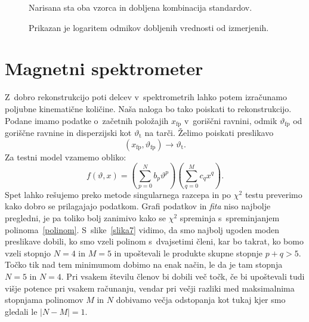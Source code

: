 \documentclass[a4paper,pdftex,12pt]{article}
\numberwithin{figure}{section} %
\begin{document}
\begin{figure}    
    \resizebox{0.98\linewidth}{!}{}
    \caption{Narisana sta oba vzorca in dobljena kombinacija standardov.}
    \label{slika5}
\end{figure}
\begin{figure}    
    \resizebox{0.98\linewidth}{!}{}
    \caption{Prikazan je logaritem odmikov dobljenih vrednosti od izmerjenih.}
    \label{slika6}
\end{figure}


\section{Magnetni spektrometer}
Z~dobro rekonstrukcijo poti delcev v~spektrometrih lahko potem izračunamo poljubne 
kinematične količine. Naša naloga bo tako poiskati to rekonstrukcijo. Podane imamo podatke 
o~začetnih položajih $x_{\mathrm{fp}}$ v~goriščni ravnini, odmik $\vartheta_{\mathrm{fp}}$
od goriščne ravnine in disperzijski kot $\vartheta_{\mathrm{t}}$ na tarči. Želimo
poiskati preslikavo 
\begin{equation}
    (x_{\mathrm{fp}}, \vartheta_{\mathrm{fp}} ) \rightarrow \vartheta_{\mathrm{t}}.
\end{equation}
Za testni model vzamemo obliko:
\begin{equation}\label{polinom}
    f(\vartheta, x) = \left( \sum_{p=0}^N b_p \vartheta^p \right)\left(
    \sum_{q=0}^Mc_q x^q \right).
\end{equation}
Spet lahko rešujemo preko metode singularnega razcepa in po $\chi^2$ testu preverimo
kako dobro se prilagajajo podatkom. Grafi podatkov in \emph{fita} niso najbolje pregledni,
je pa toliko bolj zanimivo kako se $\chi^2$ spreminja s~spreminjanjem 
polinoma~\ref{polinom}. S~slike~\ref{slika7} vidimo, da smo najbolj ugoden moden preslikave
dobili, ko smo vzeli polinom s~dvajsetimi členi, kar bo takrat, ko bomo vzeli stopnjo
$N=4$ in $M=5$ in upoštevali le produkte skupne stopnje $p+q>5$. Točko tik nad tem 
minimumom dobimo na enak način, le da je tam stopnja $N=5$ in $N=4$. Pri vsakem številu
členov bi dobili več točk, če bi upoštevali tudi višje potence pri vsakem računanju, 
vendar pri večji razliki med maksimalnima stopnjama polinomov $M$ in $N$
dobivamo večja odstopanja kot tukaj kjer smo gledali le $|N-M|=1$. \\
\end{document}
